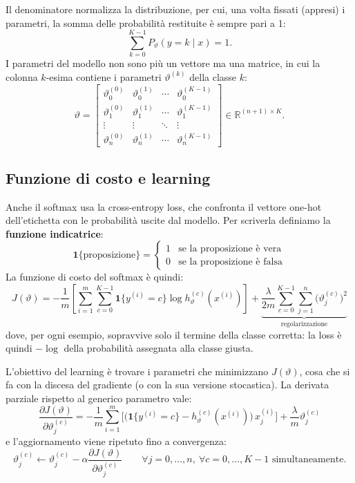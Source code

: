 Il denominatore normalizza la distribuzione, per cui, una volta fissati (appresi) i parametri, la somma delle probabilità restituite è sempre pari a 1:
\[
\sum_{k=0}^{K-1} P_\vartheta(y = k \mid x) = 1.
\]
I parametri del modello non sono più un vettore ma una matrice, in cui la colonna $k$-esima contiene i parametri $\vartheta^{(k)}$ della classe $k$:
\[
\vartheta =
\begin{bmatrix}
\vartheta_0^{(0)} & \vartheta_0^{(1)} & \cdots & \vartheta_0^{(K-1)} \\
\vartheta_1^{(0)} & \vartheta_1^{(1)} & \cdots & \vartheta_1^{(K-1)} \\
\vdots & \vdots & \ddots & \vdots \\
\vartheta_n^{(0)} & \vartheta_n^{(1)} & \cdots & \vartheta_n^{(K-1)}
\end{bmatrix}
\in \mathbb{R}^{(n+1) \times K}.
\]

\subsection{Funzione di costo e learning}
Anche il softmax usa la cross-entropy loss, che confronta il vettore one-hot dell'etichetta con le probabilità uscite dal modello. Per scriverla definiamo la \textbf{funzione indicatrice}:
\[
\mathbf{1}\{\text{proposizione}\} =
\begin{cases}
1 & \text{se la proposizione è vera} \\
0 & \text{se la proposizione è falsa}
\end{cases}
\]
La funzione di costo del softmax è quindi:
\[
J(\vartheta) = -\frac{1}{m}\left[\sum_{i=1}^{m}\sum_{c=0}^{K-1}\mathbf{1}\{y^{(i)} = c\}\log h_\vartheta^{(c)}(x^{(i)})\right] + \underbrace{\frac{\lambda}{2m}\sum_{c=0}^{K-1}\sum_{j=1}^{n}\big(\vartheta_j^{(c)}\big)^2}_{\text{regolarizzazione}}
\]
dove, per ogni esempio, sopravvive solo il termine della classe corretta: la loss è quindi $-\log$ della probabilità assegnata alla classe giusta.

L'obiettivo del learning è trovare i parametri che minimizzano $J(\vartheta)$, cosa che si fa con la discesa del gradiente (o con la sua versione stocastica). La derivata parziale rispetto al generico parametro vale:
\[
\frac{\partial J(\vartheta)}{\partial \vartheta_j^{(c)}} = -\frac{1}{m}\sum_{i=1}^{m}\Big[\big(\mathbf{1}\{y^{(i)} = c\} - h_\vartheta^{(c)}(x^{(i)})\big)\,x_j^{(i)}\Big] + \frac{\lambda}{m}\vartheta_j^{(c)}
\]
e l'aggiornamento viene ripetuto fino a convergenza:
\[
\vartheta_j^{(c)} \leftarrow \vartheta_j^{(c)} - \alpha\frac{\partial J(\vartheta)}{\partial \vartheta_j^{(c)}} \qquad \forall j = 0, \dots, n,\ \forall c = 0, \dots, K-1 \text{ simultaneamente.}
\]

